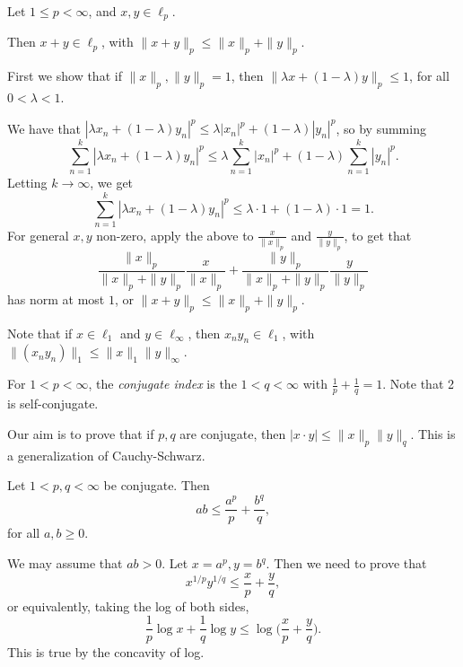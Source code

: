 \documentclass[12pt]{article}
\begin{document}
\begin{theorem}
	Let $1 \leq p < \infty$, and $x, y \in \ell_p$.

	Then $x + y \in \ell_p$, with $\|x+y\|_p \leq \|x\|_p + \|y\|_p$.
\end{theorem}

\begin{proofbox}
	First we show that if $\|x\|_p, \|y\|_p = 1$, then $\|\lambda x + (1-\lambda)y\|_p \leq 1$, for all $0 < \lambda < 1$.

	We have that $|\lambda x_n + (1-\lambda)y_n|^{p} \leq \lambda |x_n|^{p} + (1-\lambda)|y_n|^{p}$, so by summing
	\[
	\sum_{n = 1}^{k} |\lambda x_n + (1-\lambda)y_n|^{p} \leq \lambda \sum_{n = 1}^{k} |x_n|^p + (1-\lambda) \sum_{n = 1}^{k} |y_n|^p.
	\]
	Letting $k \to \infty$, we get
	\[
	\sum_{n = 1}^{k} |\lambda x_n + (1-\lambda)y_n|^p \leq \lambda \cdot 1 + (1-\lambda) \cdot 1 = 1.
	\]
	For general $x, y$ non-zero, apply the above to $\frac{x}{\|x\|_p}$ and $\frac{y}{\|y\|_p}$, to get that
	\[
	\frac{\|x\|_p}{\|x\|_p + \|y\|_p} \frac{x}{\|x\|_p} + \frac{\|y\|_p}{\|x\|_p + \|y\|_p} \frac{y}{\|y\|_p}
	\]
	has norm at most $1$, or $\|x+y\|_p \leq \|x\|_p + \|y\|_p$.
\end{proofbox}

Note that if $x \in \ell_1$ and $y \in \ell_\infty$, then $x_n y_n \in \ell_1$, with $\|(x_ny_n)\|_1 \leq \|x\|_1 \|y\|_\infty$.

For $1 < p < \infty$, the \emph{conjugate index} is the $1 < q < \infty$ with $\frac1p + \frac1q = 1$. Note that 2 is self-conjugate.

Our aim is to prove that if $p, q$ are conjugate, then $|x \cdot y| \leq \|x\|_p \|y\|_q$. This is a generalization of Cauchy-Schwarz.

\begin{lemma}
	Let $1 < p, q < \infty$ be conjugate. Then
	\[
	ab \leq \frac{a^{p}}{p} + \frac{b^{q}}{q},
	\]
	for all $a, b \geq 0$.
\end{lemma}

\begin{proofbox}
	We may assume that $ab > 0$. Let $x = a^p, y = b^q$. Then we need to prove that
	\[
	x^{1/p} y^{1/q} \leq \frac{x}{p} + \frac{y}{q},
	\]
	or equivalently, taking the log of both sides,
	\[
	\frac{1}{p} \log x + \frac{1}{q} \log y \leq \log \biggl( \frac{x}{p} + \frac{y}{q} \biggr).
	\]
	This is true by the concavity of log.
\end{proofbox}
\end{document}
